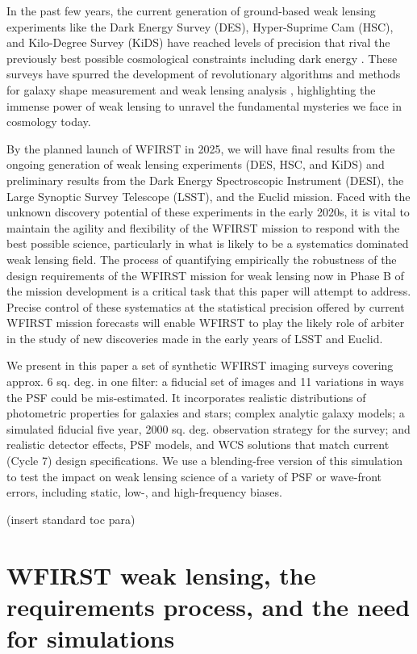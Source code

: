 \documentclass[aps,prd, amsmath,amssymb,superscriptaddress,showkeys,nofootinbib,reprint,preprintnumbers]{revtex4-1}
\newcommand\assign[1]{\todo[color=RoyalPurple!40, inline, size=\small]{Contributing: #1}}
\begin{document}
In the past few years, the current generation of ground-based weak lensing experiments like the Dark Energy Survey (DES), Hyper-Suprime Cam (HSC), and Kilo-Degree Survey (KiDS) have reached levels of precision that rival the previously best possible cosmological constraints including dark energy \cite{}. 
These surveys have spurred the development of revolutionary algorithms and methods for galaxy shape measurement and weak lensing analysis \cite{}, highlighting the immense power of weak lensing to unravel the fundamental mysteries we face in cosmology today. 

By the planned launch of WFIRST in 2025, we will have final results from the ongoing generation of weak lensing experiments (DES, HSC, and KiDS) and preliminary results from the Dark Energy Spectroscopic Instrument (DESI), the Large Synoptic Survey Telescope (LSST), and the Euclid mission. 
Faced with the unknown discovery potential of these experiments in the early 2020s, it is vital to maintain the agility and flexibility of the WFIRST mission to respond with the best possible science, particularly in what is likely to be a systematics dominated weak lensing field.
The process of quantifying empirically the robustness of the design requirements of the WFIRST mission for weak lensing now in Phase B of the mission development is a critical task that this paper will attempt to address. 
Precise control of these systematics at the statistical precision offered by current WFIRST mission forecasts will enable WFIRST to play the likely role of arbiter in the study of new discoveries made in the early years of LSST and Euclid.

We present in this paper a set of synthetic WFIRST imaging surveys covering approx. 6 sq. deg. in one filter: a fiducial set of images and 11 variations in ways the PSF could be mis-estimated. 
It incorporates realistic distributions of photometric properties for galaxies and stars; complex analytic galaxy models; a simulated fiducial five year, 2000 sq. deg. observation strategy for the survey; and realistic detector effects, PSF models, and WCS solutions that match current (Cycle 7) design specifications. 
We use a blending-free version of this simulation to test the impact on weak lensing science of a variety of PSF or wave-front errors, including static, low-, and high-frequency biases. 

(insert standard toc para) 


\section{WFIRST weak lensing, the requirements process, and the need for simulations}
\label{sec:wfirst}
\assign{Hirata}
\end{document}
